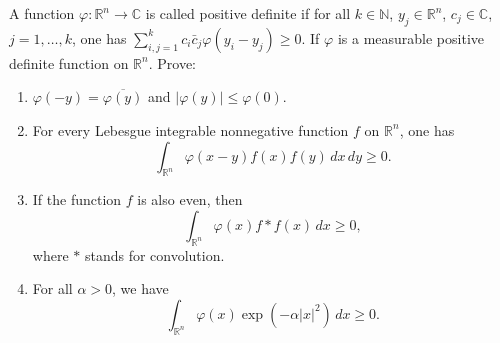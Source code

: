 \begin{exercise}
\label{analysis:2023:3}
A function $\varphi:\mathbb{R}^n\to\mathbb{C}$ is called positive definite if for all $k\in\mathbb{N}$, $y_j\in\mathbb{R}^n$, $c_j\in\mathbb{C}$, $j=1,\dots,k$, one has $\sum_{i,j=1}^k c_i\bar{c}_j\varphi(y_i-y_j) \geq 0$. If $\varphi$ is a measurable positive definite function on $\mathbb{R}^n$. Prove:

\begin{enumerate}
\item[(1)] $\varphi(-y) = \overline{\varphi(y)}$ and $|\varphi(y)|\leq\varphi(0)$.
\item[(2)] For every Lebesgue integrable nonnegative function $f$ on $\mathbb{R}^n$, one has
\[
\int_{\mathbb{R}^n}\varphi(x-y)f(x)f(y)\,dx\,dy \geq 0.
\]
\item[(3)] If the function $f$ is also even, then
\[
\int_{\mathbb{R}^n}\varphi(x)f*f(x)\,dx \geq 0,
\]
where $*$ stands for convolution.
\item[(4)] For all $\alpha>0$, we have
\[
\int_{\mathbb{R}^n}\varphi(x)\exp(-\alpha|x|^2)\,dx \geq 0.
\]
\end{enumerate}
\end{exercise}

